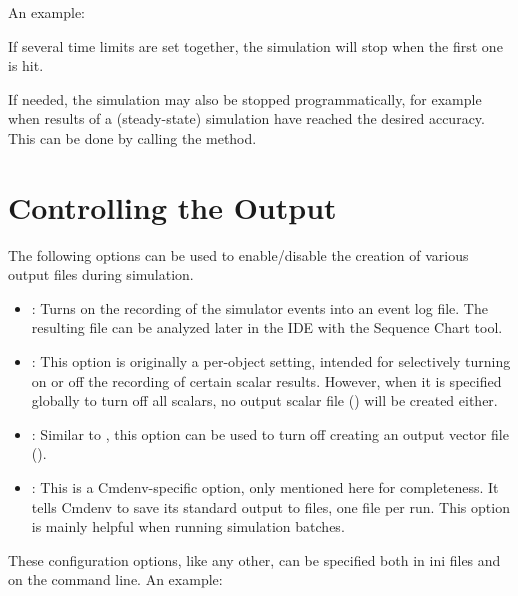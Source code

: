 An example:


If several time limits are set together, the simulation will stop when the first
one is hit.


If needed, the simulation may also be stopped programmatically, for example when
results of a (steady-state) simulation have reached the desired accuracy. 
This can be done by calling the  method.


\section{Controlling the Output}
\label{sec:run-sim:output-control}

The following options can be used to enable/disable the creation of various
output files during simulation.

\begin{itemize}
  \item {} : Turns on the recording of the simulator
        events into an event log file. The resulting  file can be
        analyzed later in the IDE with the Sequence Chart tool.
       
  \item {} : This option is originally a
        per-object setting, intended for selectively turning on or off the
        recording of certain scalar results. However, when it is specified
        globally to turn off all scalars, no output scalar file
        () will be created either.
        
  \item {} : Similar to ,
        this option can be used to turn off creating an output vector file 
        ().

  \item {} : This is a Cmdenv-specific option,
        only mentioned here for completeness. It tells Cmdenv to save its
        standard output to files, one file per run. This option is mainly
        helpful when running simulation batches.

\end{itemize}

These configuration options, like any other, can be specified both in ini
files and on the command line. An example:

